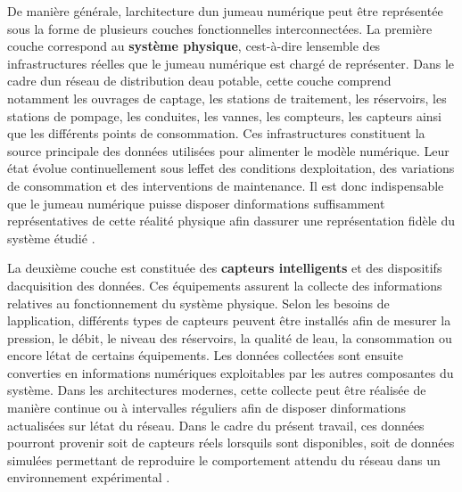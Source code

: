 \documentclass[12pt,a4paper,oneside]{report}
\begin{document}
De manière générale, l\textquotesingle architecture d\textquotesingle un
jumeau numérique peut être représentée sous la forme de plusieurs
couches fonctionnelles interconnectées. La première couche correspond au
\textbf{système physique}, c\textquotesingle est-à-dire
l\textquotesingle ensemble des infrastructures réelles que le jumeau
numérique est chargé de représenter. Dans le cadre d\textquotesingle un
réseau de distribution d\textquotesingle eau potable, cette couche
comprend notamment les ouvrages de captage, les stations de traitement,
les réservoirs, les stations de pompage, les conduites, les vannes, les
compteurs, les capteurs ainsi que les différents points de consommation.
Ces infrastructures constituent la source principale des données
utilisées pour alimenter le modèle numérique. Leur état évolue
continuellement sous l\textquotesingle effet des conditions
d\textquotesingle exploitation, des variations de consommation et des
interventions de maintenance. Il est donc indispensable que le jumeau
numérique puisse disposer d\textquotesingle informations suffisamment
représentatives de cette réalité physique afin d\textquotesingle assurer
une représentation fidèle du système étudié \cite{ref8}.

La deuxième couche est constituée des \textbf{capteurs intelligents} et
des dispositifs d\textquotesingle acquisition des données. Ces
équipements assurent la collecte des informations relatives au
fonctionnement du système physique. Selon les besoins de
l\textquotesingle application, différents types de capteurs peuvent être
installés afin de mesurer la pression, le débit, le niveau des
réservoirs, la qualité de l\textquotesingle eau, la consommation ou
encore l\textquotesingle état de certains équipements. Les données
collectées sont ensuite converties en informations numériques
exploitables par les autres composantes du système. Dans les
architectures modernes, cette collecte peut être réalisée de manière
continue ou à intervalles réguliers afin de disposer
d\textquotesingle informations actualisées sur l\textquotesingle état du
réseau. Dans le cadre du présent travail, ces données pourront provenir
soit de capteurs réels lorsqu\textquotesingle ils sont disponibles, soit
de données simulées permettant de reproduire le comportement attendu du
réseau dans un environnement expérimental \cite{ref20}.
\end{document}
